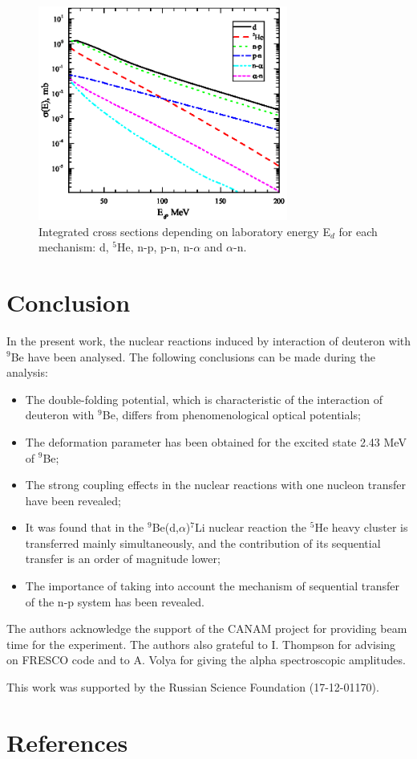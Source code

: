 \documentclass[10pt]{iopart}
\begin{document}
\begin{figure}[tp]
\centering
\includegraphics[width=8.2cm]{CS.eps}
\caption{\label{CS} Integrated cross sections depending on laboratory energy E$_d$ for each mechanism: d, ${}^5$He, n-p, p-n, n-$\alpha$ and $\alpha$-n. }
\end{figure}	
	
\section{Conclusion}
In the present work, the nuclear reactions induced by interaction of deuteron with ${}^9$Be  have been analysed. The following conclusions can be made during the analysis:
\begin{itemize}
\item The double-folding potential, which is characteristic of the interaction of deuteron with ${}^9$Be, differs from phenomenological optical potentials;
\item  The deformation parameter has been obtained for the excited state 2.43 MeV of ${}^9$Be;
\item The strong coupling effects in the nuclear reactions with one nucleon transfer have been revealed;
\item It was found that  in the ${}^9$Be(d,$\alpha$)${}^7$Li nuclear reaction the ${}^5$He heavy cluster  is transferred mainly simultaneously, and the contribution of its sequential transfer is an order of magnitude lower;
\item The importance of taking into account the mechanism of sequential transfer of the n-p system has been revealed.
\end{itemize}

\ack
	The authors acknowledge the support of the CANAM project \cite{canam} for providing beam time for the experiment. The authors also grateful to I. Thompson for advising on FRESCO code and to A. Volya for giving the alpha spectroscopic amplitudes.

This work was supported by the Russian Science Foundation (17-12-01170).



\section*{References}



\end{document}
